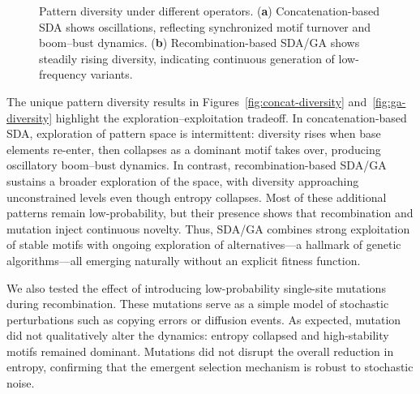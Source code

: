\documentclass[life,article,submit,pdftex,moreauthors]{Definitions/mdpi}
\begin{document}
\begin{figure}[H]
\centering
{}
\hfill
{}
\caption{Pattern diversity under different operators. (\textbf{a}) Concatenation-based SDA shows oscillations, reflecting synchronized motif turnover and boom--bust dynamics. (\textbf{b}) Recombination-based SDA/GA shows steadily rising diversity, indicating continuous generation of low-frequency variants.}
\label{fig:diversity-comparison}
\end{figure}


The unique pattern diversity results in Figures~\ref{fig:concat-diversity} and~\ref{fig:ga-diversity} highlight the exploration--exploitation tradeoff. 
In concatenation-based SDA, exploration of pattern space is intermittent: 
diversity rises when base elements re-enter, then collapses as a dominant 
motif takes over, producing oscillatory boom--bust dynamics. In contrast, 
recombination-based SDA/GA sustains a broader exploration of the space, 
with diversity approaching unconstrained levels even though entropy 
collapses. Most of these additional patterns remain low-probability, but 
their presence shows that recombination and mutation inject continuous 
novelty. Thus, SDA/GA combines strong exploitation of stable motifs with 
ongoing exploration of alternatives---a hallmark of genetic algorithms---all 
emerging naturally without an explicit fitness function.


We also tested the effect of introducing low-probability single-site mutations during recombination. 
These mutations serve as a simple model of stochastic perturbations such as copying errors or
diffusion events. As expected, mutation did not qualitatively alter the dynamics: entropy
collapsed and high-stability motifs remained dominant. Mutations did not disrupt the overall reduction in entropy, confirming that the emergent selection mechanism is robust to stochastic noise.
\end{document}

